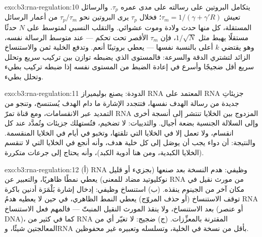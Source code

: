 \begin{solution}{exo:b3:rna-regulation:10}
يتكامل البروتين على رسالته على مدى عمره $\tau_{p}$. والرسائل تعيش
$\tau_{m} = 1/(\gamma + \gamma' R)$؛ فخلال $\tau_{p}$ يرى البروتين
نحو $\tau_{p}/\tau_{m}$ من أعمار الرسائل المستقلة، كل منها حدث ولادة
وموت عشوائي. والتقلب النسبي لمتوسط على $N$ حدثًا مستقلًا يهبط
مثل $1/\sqrt{N}$، فإن $\tau_{m}$ الأقصر تحت تحكم  --- عند
متوسط الرسالة نفسه، وهو يقتضي $k$ أعلى بالنسبة نفسها ---
يعطي بروتينًا أنعم. وتدفع الخلية ثمن  والاستنساخ الزائد
لتشتري الدقة والسرعة: فالمستوى الذي يضبطه توازن بين تركيب سريع
وتحلل سريع أقل ضجيجًا وأسرع في إعادة الضبط من المستوى نفسه إذا
ضبطه تركيب بطيء وتحلل بطيء.
\end{solution}

\begin{solution}{exo:b3:rna-regulation:11}
الدودة: يصنع بوليميراز RNA المعتمد على RNA جزيئاتِ  جديدة من
رسالة الهدف نفسها، فتتجدد الإشارة ما دام الهدف يُستنسخ، وتنجو من
التمديد عبر الانقسامات، ومع قناة تمرّ RNA المزدوج بين الخلايا تنتشر
إلى أنسجة أخرى وإلى السلالة الجنسية بضعة أجيال. والثدييات: لا تضخيم،
فتُستهلك جزيئات  وتُمدَّد عند كل انقسام، ولا تعمل إلا في الخلايا
التي تلقتها، وتخبو في أيام في الخلايا المنقسمة. والنتيجة: أن دواء
 يجب أن يوصَل إلى كل خلية هدف، وأنه أنجع في الخلايا التي لا
تنقسم (الخلايا الكبدية، ومن هنا أدوية الكبد)، وأنه يحتاج إلى جرعات
متكررة.
\end{solution}

\begin{solution}{exo:b3:rna-regulation:12}
(أ) RNA وظيفي: هدم النسخة بعد صنعها (بجزيء  أو قليل نوكليوتيد مضاد
للمعنى) يعطي نمطًا ظاهريًا، والتعبير عن RNA من مورث نقيل في مكان آخر
من الجينوم ينقذه. (ب) استنساخ وظيفي: إدخال إشارة بَلْمَرَة أدنين
باكرة توقف الاستنساخ (أو حذف المروّج) يعطي النمط الظاهري، في حين لا
يعطيه هدمُ RNA بعد الاستنساخ، ولا ينقذ المورث النقيل المنبتّ --- فالمهم
فعل الاستنساخ (أو عنصر DNA)، كما في كثير من RNA المقترنة
بالمعزِّزات. (ج) ضجيج: لا تغيّر أي من المعالجتين شيئًا، وRNA بأقل من
نسخة في الخلية، وتسلسله وتعبيره غير محفوظين.
\end{solution}


